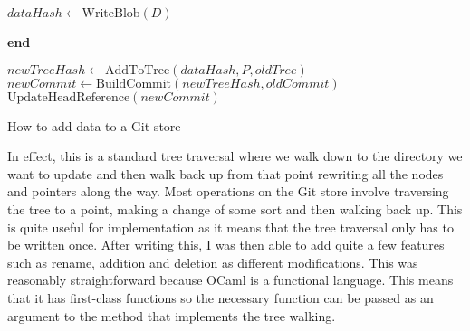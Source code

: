 \begin{algorithm}[h]
\SetAlgoLined
\DontPrintSemicolon



\BlankLine
{}
$ dataHash \leftarrow \textrm{WriteBlob}(D) $\;

\BlankLine
{}
\textbf{end}

\BlankLine
{}
$ newTreeHash \leftarrow \textrm{AddToTree}(dataHash, P, oldTree) $\;
$ newCommit \leftarrow \textrm{BuildCommit}(newTreeHash, oldCommit) $\;
$ \textrm{UpdateHeadReference}(newCommit) $\;
\caption{How to add data to a Git store}
\label{algorithm:addtostore}
\end{algorithm}
\medskip

In effect, this is a standard tree traversal where we walk down to the directory we want to update and then walk back up from that point rewriting all the nodes and pointers along the way. Most operations on the Git store involve traversing the tree to a point, making a change of some sort and then walking back up. This is quite useful for implementation as it means that the tree traversal only has to be written once. After writing this, I was then able to add quite a few features such as rename, addition and deletion as different modifications. This was reasonably straightforward because OCaml is a functional language. This means that it has first-class functions so the necessary function can be passed as an argument to the method that implements the tree walking.

